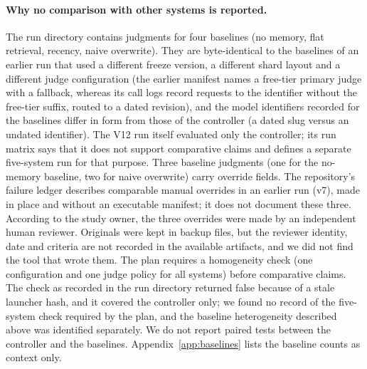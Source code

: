 \paragraph{Why no comparison with other systems is reported.} The run directory contains judgments for four baselines (no memory, flat retrieval, recency, naive overwrite). They are byte-identical to the baselines of an earlier run that used a different freeze version, a different shard layout and a different judge configuration (the earlier manifest names a free-tier primary judge with a fallback, whereas its call logs record requests to the identifier without the free-tier suffix, routed to a dated revision), and the model identifiers recorded for the baselines differ in form from those of the controller (a dated slug versus an undated identifier). The V12 run itself evaluated only the controller; its run matrix says that it does not support comparative claims and defines a separate five-system run for that purpose. Three baseline judgments (one for the no-memory baseline, two for naive overwrite) carry override fields. The repository's failure ledger describes comparable manual overrides in an earlier run (v7), made in place and without an executable manifest; it does not document these three. According to the study owner, the three overrides were made by an independent human reviewer. Originals were kept in backup files, but the reviewer identity, date and criteria are not recorded in the available artifacts, and we did not find the tool that wrote them. The plan requires a homogeneity check (one configuration and one judge policy for all systems) before comparative claims. The check as recorded in the run directory returned false because of a stale launcher hash, and it covered the controller only; we found no record of the five-system check required by the plan, and the baseline heterogeneity described above was identified separately. We do not report paired tests between the controller and the baselines. Appendix~\ref{app:baselines} lists the baseline counts as context only.

